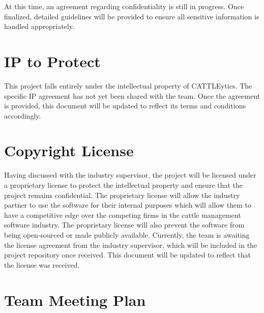 \documentclass{article}
\begin{document}
At this time, an agreement regarding confidentiality is still in progress. Once finalized, detailed guidelines will be provided to ensure all sensitive information is handled appropriately.

\section{IP to Protect}
This project falls entirely under the intellectual property of CATTLEytics. The specific IP agreement has not yet been shared with the team. Once the agreement is provided, this document will be updated to reflect its terms and conditions accordingly.

\section{Copyright License}
Having discussed with the industry supervisor, the project will be licensed under a proprietary license to protect
 the intellectual property and ensure that the project remains confidential. The proprietary
  license will allow the industry partner to use the software for their internal purposes which will allow them to have a competitive edge over the competing firms in the cattle management software industry.
  The proprietary license will also prevent the software from being open-sourced or made publicly available. 
  Currently, the team is awaiting the license agreement from the industry supervisor, which will be included in the project repository once received. This document will be updated to reflect that the license was received.

\section{Team Meeting Plan}
\end{document}
